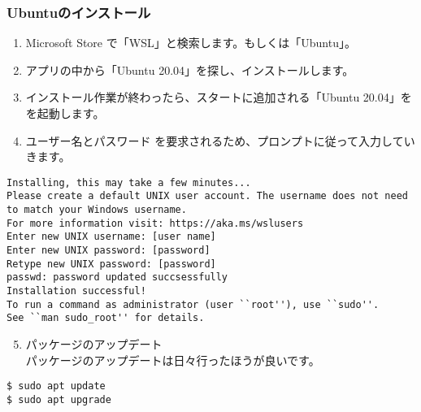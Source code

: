 \subsubsection{Ubuntuのインストール}
\begin{enumerate}
    \item Microsoft Store で「WSL」と検索します。もしくは「Ubuntu」。
    \item アプリの中から「Ubuntu 20.04」を探し、インストールします。
    \item インストール作業が終わったら、スタートに追加される「Ubuntu 20.04」をを起動します。
    \item ユーザー名とパスワード を要求されるため、プロンプトに従って入力していきます。
\end{enumerate}
\begin{lstlisting}[caption=表示されるスクリプト例]
Installing, this may take a few minutes...
Please create a default UNIX user account. The username does not need to match your Windows username.
For more information visit: https://aka.ms/wslusers
Enter new UNIX username: [user name]
Enter new UNIX password: [password]
Retype new UNIX password: [password]
passwd: password updated succsessfully
Installation successful!
To run a command as administrator (user ``root''), use ``sudo''.
See ``man sudo_root'' for details.
\end{lstlisting}
\begin{enumerate}
    \setcounter{enumi}{4}
    \item パッケージのアップデート\\
        パッケージのアップデートは日々行ったほうが良いです。
\end{enumerate}
\begin{lstlisting}
$ sudo apt update
$ sudo apt upgrade
\end{lstlisting}

